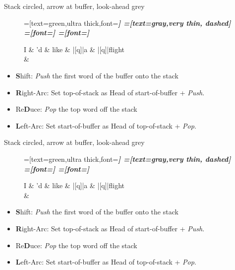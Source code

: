 \documentclass{lecture}
\begin{document}
\begin{plain}{Stack circled, arrow at buffer, look-ahead grey}
\begin{figure}
    \centering
    \begin{dependency}[theme=simple]
    =[text=green,ultra thick,font=\bfseries\itshape]
    =[text=gray,very thin, dashed]
    =[font=\bfseries\itshape]
    =[font=\itshape]
    \begin{deptext}[column sep=.075cm, row sep=.1ex]
        I \& 'd \& like \& |[q]|a \& |[q]|flight \\
         \& \\
    \end{deptext}
\end{dependency}
\end{figure}
    \begin{itemize}
        \item \textbf{S}hift: \emph{Push} the first word of the buffer onto the stack
    \item \textbf{R}ight-Arc: Set top-of-stack as Head of start-of-buffer + \emph{Push}.
    \item Re\textbf{D}uce: \emph{Pop} the top word off the stack
    \item \textbf{L}eft-Arc: Set start-of-buffer as Head of top-of-stack + \emph{Pop}.
    \end{itemize}
\end{plain}


\begin{plain}{Stack circled, arrow at buffer, look-ahead grey}
\begin{figure}
    \centering
    \begin{dependency}[theme=simple]
    =[text=green,ultra thick,font=\bfseries\itshape]
    =[text=gray,very thin, dashed]
    =[font=\bfseries\itshape]
    =[font=\itshape]
    \begin{deptext}[column sep=.075cm, row sep=.1ex]
        I \& 'd \& like \& |[q]|a \& |[q]|flight \\
         \& \\
    \end{deptext}
\end{dependency}
\end{figure}
    \begin{itemize}
        \item \textbf{S}hift: \emph{Push} the first word of the buffer onto the stack
    \item \textbf{R}ight-Arc: Set top-of-stack as Head of start-of-buffer + \emph{Push}.
    \item Re\textbf{D}uce: \emph{Pop} the top word off the stack
    \item \textbf{L}eft-Arc: Set start-of-buffer as Head of top-of-stack + \emph{Pop}.
    \end{itemize}
\end{plain}
\end{document}

